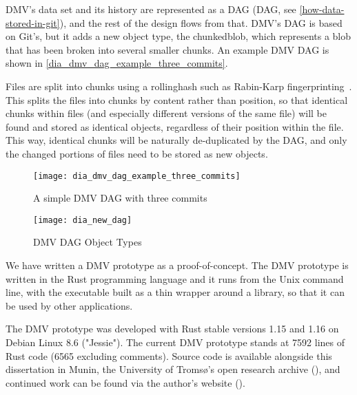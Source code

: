 \gls{DMV}'s data set and its history are represented as a \acrshort{DAG} (\acrlong{DAG}, see \autoref{how-data-stored-in-git}), and the rest of the design flows from that.
\gls{DMV}'s \gls{DAG} is based on Git's, but it adds a new object type, the \gls{chunkedblob}, which represents a \gls{blob} that has been broken into several smaller chunks.
An example \gls{DMV} \gls{DAG} is shown in \autoref{dia_dmv_dag_example_three_commits}.


Files are split into chunks using a \gls{rollinghash} such as Rabin-Karp fingerprinting~\cite{rabin_karp_fingerprinting}.
This splits the files into chunks by content rather than position, so that identical chunks within files (and especially different versions of the same file) will be found and stored as identical objects, regardless of their position within the file.
This way, identical chunks will be naturally de-duplicated by the \gls{DAG}, and only the changed portions of files need to be stored as new objects.


\begin{figure}[]
    \centering
    \texttt{[image: dia\_dmv\_dag\_example\_three\_commits]}
    \caption{A simple DMV DAG with three commits}
    \label{dia_dmv_dag_example_three_commits}
\end{figure}

\begin{figure}[]
    \centering
        \texttt{[image: dia\_new\_dag]}
    \caption{DMV DAG Object Types}
    \label{fig:dia_new_dag}
\end{figure}


We have written a \gls{DMV} prototype as a proof-of-concept. The \gls{DMV}
prototype is written in the Rust programming language and it runs from the Unix
command line, with the executable built as a thin wrapper around a library, so
that it can be used by other applications.

The \gls{DMV} prototype was developed with Rust stable versions 1.15 and 1.16 on
Debian Linux 8.6 ("Jessie"). The current DMV prototype stands at \num{7592}
lines of Rust code (\num{6565} excluding comments). Source code is available
alongside this dissertation in Munin, the University of Tromsø's open research
archive (\muninurl), and continued work can be found via the author's website
(\dmvurl).

